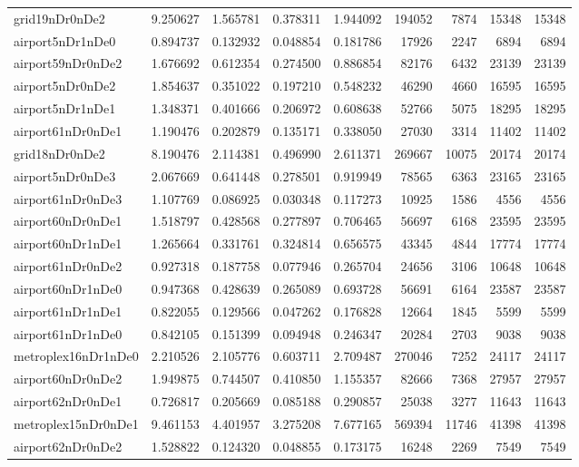 \begin{longtable}{|l|r|r|r|r|r|r|r|r|}
grid19nDr0nDe2 & 9.250627 & 1.565781 & 0.378311 & 1.944092 & 194052 & 7874 & 15348 & 15348 \\
airport5nDr1nDe0 & 0.894737 & 0.132932 & 0.048854 & 0.181786 & 17926 & 2247 & 6894 & 6894 \\
airport59nDr0nDe2 & 1.676692 & 0.612354 & 0.274500 & 0.886854 & 82176 & 6432 & 23139 & 23139 \\
airport5nDr0nDe2 & 1.854637 & 0.351022 & 0.197210 & 0.548232 & 46290 & 4660 & 16595 & 16595 \\
airport5nDr1nDe1 & 1.348371 & 0.401666 & 0.206972 & 0.608638 & 52766 & 5075 & 18295 & 18295 \\
airport61nDr0nDe1 & 1.190476 & 0.202879 & 0.135171 & 0.338050 & 27030 & 3314 & 11402 & 11402 \\
grid18nDr0nDe2 & 8.190476 & 2.114381 & 0.496990 & 2.611371 & 269667 & 10075 & 20174 & 20174 \\
airport5nDr0nDe3 & 2.067669 & 0.641448 & 0.278501 & 0.919949 & 78565 & 6363 & 23165 & 23165 \\
airport61nDr0nDe3 & 1.107769 & 0.086925 & 0.030348 & 0.117273 & 10925 & 1586 & 4556 & 4556 \\
airport60nDr0nDe1 & 1.518797 & 0.428568 & 0.277897 & 0.706465 & 56697 & 6168 & 23595 & 23595 \\
airport60nDr1nDe1 & 1.265664 & 0.331761 & 0.324814 & 0.656575 & 43345 & 4844 & 17774 & 17774 \\
airport61nDr0nDe2 & 0.927318 & 0.187758 & 0.077946 & 0.265704 & 24656 & 3106 & 10648 & 10648 \\
airport60nDr1nDe0 & 0.947368 & 0.428639 & 0.265089 & 0.693728 & 56691 & 6164 & 23587 & 23587 \\
airport61nDr1nDe1 & 0.822055 & 0.129566 & 0.047262 & 0.176828 & 12664 & 1845 & 5599 & 5599 \\
airport61nDr1nDe0 & 0.842105 & 0.151399 & 0.094948 & 0.246347 & 20284 & 2703 & 9038 & 9038 \\
metroplex16nDr1nDe0 & 2.210526 & 2.105776 & 0.603711 & 2.709487 & 270046 & 7252 & 24117 & 24117 \\
airport60nDr0nDe2 & 1.949875 & 0.744507 & 0.410850 & 1.155357 & 82666 & 7368 & 27957 & 27957 \\
airport62nDr0nDe1 & 0.726817 & 0.205669 & 0.085188 & 0.290857 & 25038 & 3277 & 11643 & 11643 \\
metroplex15nDr0nDe1 & 9.461153 & 4.401957 & 3.275208 & 7.677165 & 569394 & 11746 & 41398 & 41398 \\
airport62nDr0nDe2 & 1.528822 & 0.124320 & 0.048855 & 0.173175 & 16248 & 2269 & 7549 & 7549 \\

\end{longtable}
